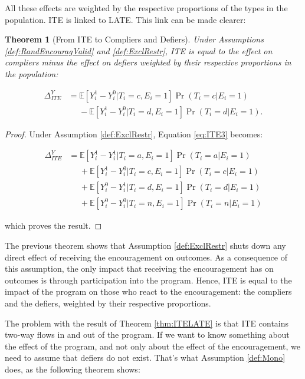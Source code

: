 \documentclass[
]{book}
\newcommand{\esp}[1]{\mathbb{E}[ #1 ]}
\newtheorem{theorem}{Theorem}[chapter]
\theoremstyle{definition}
\theoremstyle{definition}
\theoremstyle{definition}
\theoremstyle{definition}
\theoremstyle{remark}
\begin{document}
All these effects are weighted by the respective proportions of the types in the population.
ITE is linked to LATE.
This link can be made clearer:

\begin{theorem}[From ITE to Compliers and Defiers]
\protect\hypertarget{thm:ITELATE}{}{\label{thm:ITELATE} \iffalse (From ITE to Compliers and Defiers) \fi{} }Under Assumptions \ref{def:RandEncouragValid} and \ref{def:ExclRestr}, ITE is equal to the effect on compliers minus the effect on defiers weighted by their respective proportions in the population:

\begin{align*}
  \Delta^Y_{ITE} & = \esp{Y_i^{1}-Y_i^{0}|T_i=c,E_i=1}\Pr(T_i=c|E_i=1)\\
                  & \phantom{=}-\esp{Y_i^{1}-Y_i^{0}|T_i=d,E_i=1}\Pr(T_i=d|E_i=1).
\end{align*}
\end{theorem}

\begin{proof}
\iffalse{} {Proof. } \fi{}Under Assumption \ref{def:ExclRestr}, Equation \eqref{eq:ITE3} becomes:

\begin{align*}
  \Delta^Y_{ITE} & = \esp{Y_i^{1}-Y_i^{1}|T_i=a,E_i=1}\Pr(T_i=a|E_i=1)\\
                & \phantom{=}+ \esp{Y_i^{1}-Y_i^{0}|T_i=c,E_i=1}\Pr(T_i=c|E_i=1)\\
                & \phantom{=}+ \esp{Y_i^{0}-Y_i^{1}|T_i=d,E_i=1}\Pr(T_i=d|E_i=1)\\
                & \phantom{=}+ \esp{Y_i^{0}-Y_i^{0}|T_i=n,E_i=1}\Pr(T_i=n|E_i=1)
\end{align*}

which proves the result.
\end{proof}

The previous theorem shows that Assumption \ref{def:ExclRestr} shuts down any direct effect of receiving the encouragement on outcomes.
As a consequence of this assumption, the only impact that receiving the encouragement has on outcomes is through participation into the program.
Hence, ITE is equal to the impact of the program on those who react to the encouragement: the compliers and the defiers, weighted by their respective proportions.

The problem with the result of Theorem \ref{thm:ITELATE} is that ITE contains two-way flows in and out of the program.
If we want to know something about the effect of the program, and not only about the effect of the encouragement, we need to assume that defiers do not exist.
That's what Assumption \ref{def:Mono} does, as the following theorem shows:
\end{document}
